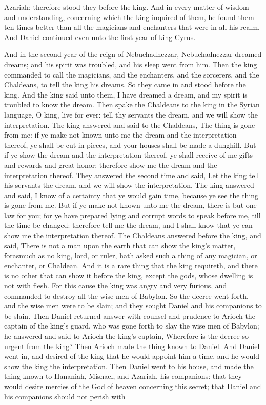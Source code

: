 Azariah: therefore stood they before the king. And in every matter of wisdom and understanding, concerning which the king inquired of them, he found them ten times better than all the magicians and enchanters that were in all his realm. And Daniel continued even unto the first year of king Cyrus. 

And in the second year of the reign of Nebuchadnezzar, Nebuchadnezzar dreamed dreams; and his spirit was troubled, and his sleep went from him. Then the king commanded to call the magicians, and the enchanters, and the sorcerers, and the Chaldeans, to tell the king his dreams. So they came in and stood before the king. And the king said unto them, I have dreamed a dream, and my spirit is troubled to know the dream. Then spake the Chaldeans to the king in the Syrian language, O king, live for ever: tell thy servants the dream, and we will show the interpretation. The king answered and said to the Chaldeans, The thing is gone from me: if ye make not known unto me the dream and the interpretation thereof, ye shall be cut in pieces, and your houses shall be made a dunghill. But if ye show the dream and the interpretation thereof, ye shall receive of me gifts and rewards and great honor: therefore show me the dream and the interpretation thereof. They answered the second time and said, Let the king tell his servants the dream, and we will show the interpretation. The king answered and said, I know of a certainty that ye would gain time, because ye see the thing is gone from me. But if ye make not known unto me the dream, there is but one law for you; for ye have prepared lying and corrupt words to speak before me, till the time be changed: therefore tell me the dream, and I shall know that ye can show me the interpretation thereof. The Chaldeans answered before the king, and said, There is not a man upon the earth that can show the king’s matter, forasmuch as no king, lord, or ruler, hath asked such a thing of any magician, or enchanter, or Chaldean. And it is a rare thing that the king requireth, and there is no other that can show it before the king, except the gods, whose dwelling is not with flesh. For this cause the king was angry and very furious, and commanded to destroy all the wise men of Babylon. So the decree went forth, and the wise men were to be slain; and they sought Daniel and his companions to be slain.  Then Daniel returned answer with counsel and prudence to Arioch the captain of the king’s guard, who was gone forth to slay the wise men of Babylon; he answered and said to Arioch the king’s captain, Wherefore is the decree so urgent from the king? Then Arioch made the thing known to Daniel. And Daniel went in, and desired of the king that he would appoint him a time, and he would show the king the interpretation.  Then Daniel went to his house, and made the thing known to Hananiah, Mishael, and Azariah, his companions: that they would desire mercies of the God of heaven concerning this secret; that Daniel and his companions should not perish with 
